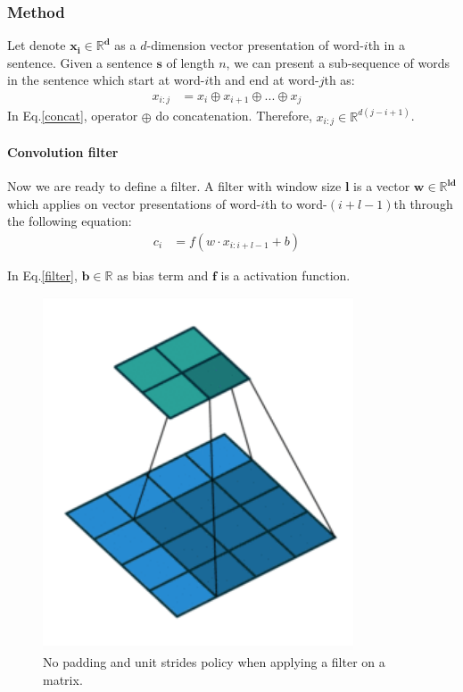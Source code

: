 \subsubsection{Method}
Let denote \(\bm{x_i \in \mathbb{R}^d}\) as a \(d\)-dimension vector presentation of word-\(i\)th in a sentence.
Given a sentence \(\bm{s}\) of length \(n\), we can present a sub-sequence of words in the sentence which start at word-\(i\)th and end at word-\(j\)th as:
\begin{align}
    x_{i:j} &= x_i \oplus x_{i+1} \oplus ... \oplus x_{j} &\label{concat}
\end{align}
In Eq.\eqref{concat}, operator \(\bm{\oplus}\) do concatenation. Therefore, \(x_{i:j} \in \mathbb{R}^{d(j-i+1)}\).

\paragraph{Convolution filter} \label{conv-filter} Now we are ready to define a filter.
A filter with window size \(\bm{l}\) is a vector \(\bm{w \in \mathbb{R}^{ld}}\) which applies on vector presentations of word-\(i\)th to word-\((i+l-1)\)th through the following equation:
\begin{align}
    c_i &= f(w \cdot x_{i:i+l-1} + b) &\label{filter}
\end{align}

In Eq.\eqref{filter}, \(\bm{b \in \mathbb{R}}\) as bias term and \(\bm{f}\) is a activation function.

\begin{figure}[H]
    \centering
    \includegraphics[scale=0.4]{figure/no_padding}
    \caption[Convolution filter policy]{No padding and unit strides policy when applying a filter on a matrix.}
    \label{fig:no_padding}
\end{figure}

